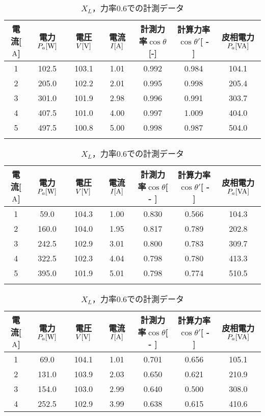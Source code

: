 \begin{table}[h]
	\centering
	\caption{$X_{L}$，力率$1.0$での計測データ}
	\label{tab:1data}
\begin{tabular}{ccccccc}
	\hline
	電流[$\rm{A}$] & 電力$P_a[\rm{W}]$ & 電圧$V[\rm{V}]$ & 電流$I[\rm{A}]$ & 計測力率$\cos \theta$[\rm{-}]  & 計算力率$\cos \theta '$[ - ]  & 皮相電力$P_a[\rm{VA}]$ \\ \hline
	1      & 102.5   & 103.1   & 1.01  & 0.992 & 0.984 & 104.1   \\
	2      & 205.0   & 102.2   & 2.01  & 0.995 & 0.998 & 205.4   \\
	3      & 301.0   & 101.9   & 2.98  & 0.996 & 0.991 & 303.7   \\
	4      & 407.5   & 101.0   & 4.00  & 0.997 & 1.009 & 404.0   \\
	5      & 497.5   & 100.8   & 5.00  & 0.998 & 0.987 & 504.0     \\ \hline\\
\end{tabular}
	\caption{$X_{L}$，力率$0.8$での計測データ}
	\label{tab:0.8data}
\begin{tabular}{ccccccc}
	\hline
	電流[$\rm{A}$] & 電力$P_a[\rm{W}]$ & 電圧$V[\rm{V}]$ & 電流$I[\rm{A}]$ & 計測力率$\cos \theta$[ - ] & 計算力率$\cos \theta '$[ - ] & 皮相電力$P_a[\rm{VA}]$ \\ \hline
	1 & 59.0  & 104.3 & 1.00 & 0.830 & 0.566 & 104.3 \\
	2 & 160.0 & 104.0 & 1.95 & 0.817 & 0.789 & 202.8 \\
	3 & 242.5 & 102.9 & 3.01 & 0.800 & 0.783 & 309.7 \\
	4 & 322.5 & 102.3 & 4.04 & 0.798 & 0.780 & 413.3 \\
	5 & 395.0 & 101.9 & 5.01 & 0.798 & 0.774 & 510.5 \\ \hline\\
\end{tabular}
	\caption{$X_{L}$，力率$0.6$での計測データ}
	\label{tab:0.6data}
\begin{tabular}{ccccccc}
	\hline
	電流[$\rm{A}$] & 電力$P_a[\rm{W}]$ & 電圧$V[\rm{V}]$ & 電流$I[\rm{A}]$ & 計測力率$\cos \theta$[ - ] & 計算力率$\cos \theta '$[ - ] & 皮相電力$P_a[\rm{VA}]$ \\ \hline
	1 & 69.0  & 104.1 & 1.01 & 0.701 & 0.656 & 105.1 \\
	2 & 131.0 & 103.9 & 2.03 & 0.650 & 0.621 & 210.9 \\
	3 & 154.0 & 103.0 & 2.99 & 0.640 & 0.500 & 308.0 \\
	4 & 252.5 & 102.9 & 3.99 & 0.638 & 0.615 & 410.6 \\

\end{tabular}
\end{table}
